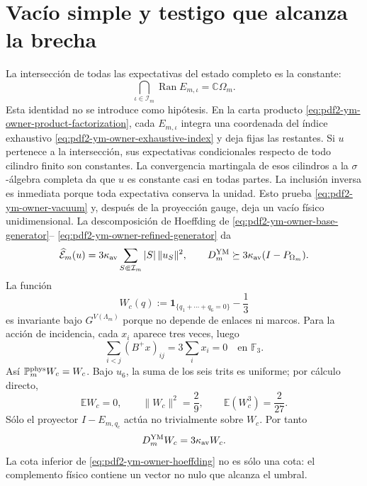 \section{Vacío simple y testigo que alcanza la brecha}

La intersección de todas las expectativas del estado completo es la constante:
\begin{equation}\label{eq:pdf2-ym-owner-vacuum}
 \bigcap_{\iota\in\mathcal I_m}\operatorname{Ran}E_{m,\iota}
 =\mathbb C\Omega_m.
\end{equation}
Esta identidad no se introduce como hipótesis. En la carta producto
\eqref{eq:pdf2-ym-owner-product-factorization}, cada $E_{m,\iota}$ integra una
coordenada del índice exhaustivo
\eqref{eq:pdf2-ym-owner-exhaustive-index} y deja fijas las restantes. Si
$u$ pertenece a la intersección, sus expectativas condicionales respecto de todo
cilindro finito son constantes. La convergencia martingala de esos cilindros a la
$\sigma$-álgebra completa da que $u$ es constante casi en todas partes. La inclusión
inversa es inmediata porque toda expectativa conserva la unidad. Esto prueba
\eqref{eq:pdf2-ym-owner-vacuum} y, después de la proyección gauge, deja un vacío
físico unidimensional.
La descomposición de Hoeffding de
\eqref{eq:pdf2-ym-owner-base-generator}--
\eqref{eq:pdf2-ym-owner-refined-generator} da
\begin{equation}\label{eq:pdf2-ym-owner-hoeffding}
 \widehat{\mathcal E}_m(u)
 =3\kappa_{\rm av}\sum_{S\Subset\mathcal I_m}|S|\,\|u_S\|^2,
 \qquad
 D_m^{\rm YM}\succeq
 3\kappa_{\rm av}(I-P_{\Omega_m}).
\end{equation}
La función
\begin{equation}\label{eq:pdf2-ym-owner-wc}
 W_c(q):=\mathbf1_{\{q_1+\cdots+q_6=0\}}-\frac13
\end{equation}
es invariante bajo $G^{V(\Lambda_m)}$ porque no depende de enlaces ni marcos. Para
la acción de incidencia, cada $x_i$ aparece tres veces, luego
\begin{equation}\label{eq:pdf2-ym-owner-wc-invariance}
 \sum_{i<j}(B^+x)_{ij}=3\sum_i x_i=0
 \quad\text{en }\mathbb F_3.
\end{equation}
Así $\mathbb P_m^{\rm phys}W_c=W_c$. Bajo $u_6$, la suma de los seis trits es
uniforme; por cálculo directo,
\begin{equation}\label{eq:pdf2-ym-owner-wc-moments}
 \mathbb EW_c=0,\qquad
 \|W_c\|^2=\frac29,\qquad
 \mathbb E(W_c^3)=\frac2{27}.
\end{equation}
Sólo el proyector $I-E_{m,q_c}$ actúa no trivialmente sobre $W_c$. Por tanto
\begin{equation}\label{eq:pdf2-ym-owner-wc-eigenvalue}
 D_m^{\rm YM}W_c=3\kappa_{\rm av}W_c.
\end{equation}
La cota inferior de \eqref{eq:pdf2-ym-owner-hoeffding} no es sólo una cota: el
complemento físico contiene un vector no nulo que alcanza el umbral.

